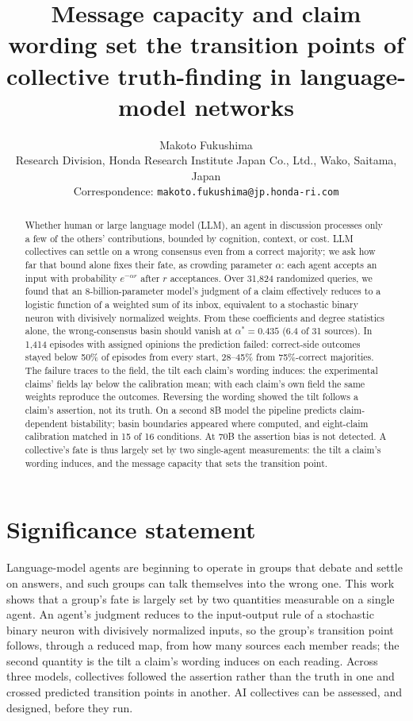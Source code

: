 \documentclass[11pt]{article}
\title{Message capacity and claim wording set the transition points of collective truth-finding in language-model networks}
\author{Makoto Fukushima\\[3pt]
{\normalsize Research Division, Honda Research Institute Japan Co., Ltd.,
Wako, Saitama, Japan}\\[2pt]
{\small Correspondence: \texttt{makoto.fukushima@jp.honda-ri.com}}}
\date{}
\newcommand{\astar}{\alpha^{*}}
\begin{document}
\maketitle

\begin{abstract}
Whether human or large language model (LLM), an agent in discussion
processes only a few of the others' contributions, bounded by cognition,
context, or cost.
LLM collectives can settle on a wrong consensus even from a correct majority;
we ask how far that bound alone fixes their fate, as crowding parameter
$\alpha$: each agent accepts an input with probability $e^{-\alpha r}$
after $r$ acceptances. Over 31{,}824 randomized queries,
we found that an 8-billion-parameter model's judgment of a claim effectively
reduces to a logistic function of a weighted sum of its inbox, equivalent to a
stochastic binary neuron with divisively normalized weights. From these
coefficients and degree statistics alone, the wrong-consensus basin should
vanish at $\astar = 0.435$ (6.4 of 31 sources). In 1{,}414 episodes
with assigned opinions the prediction failed: correct-side outcomes stayed
below 50\% of episodes from every start, 28--45\% from 75\%-correct
majorities. The failure traces to the field, the tilt each claim's wording
induces: the experimental claims' fields lay below the calibration mean;
with each claim's own field the same weights reproduce the outcomes.
Reversing the wording showed the tilt follows a claim's assertion, not its
truth. On a
second 8B model the pipeline predicts claim-dependent bistability; basin
boundaries appeared where computed, and eight-claim calibration matched in
15 of 16 conditions. At 70B the assertion bias is not detected.
A collective's fate is thus largely set by two single-agent
measurements: the tilt a claim's wording induces, and the message capacity
that sets the transition point.
\end{abstract}

\section*{Significance statement}

Language-model agents are beginning to operate in groups that debate and
settle on answers, and such groups can talk themselves into the wrong one.
This work shows that a group's fate is largely set by two quantities
measurable on a single agent. An agent's judgment reduces to the input-output
rule of a stochastic binary neuron with divisively normalized inputs, so the
group's transition point follows, through a reduced map, from how many
sources each member reads; the second quantity is the tilt a claim's wording
induces on each reading. Across three models, collectives followed the
assertion rather than the truth in one and crossed predicted transition
points in another. AI
collectives can be assessed, and designed, before they run.
\end{document}
